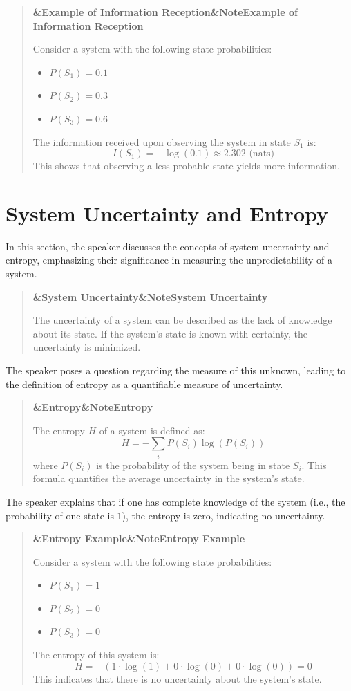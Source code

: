 \documentclass[a4paper]{article}
\newcommand{\boxheading}[1]{%
  \par\smallskip
  \noindent\textbf{\ifx&#1&Note\else#1\fi}\par
  \smallskip
}
\newenvironment{defbox}[1][]{%
  \begin{quote}\color{green!40!black}\boxheading{#1}\normalcolor
}{\end{quote}}
\newenvironment{exbox}[1][]{%
  \begin{quote}\color{brown!70!black}\boxheading{#1}\normalcolor
}{\end{quote}}
\newenvironment{rembox}[1][]{%
  \begin{quote}\color{black!70}\boxheading{#1}\normalcolor
}{\end{quote}}
\begin{document}
\begin{exbox}[Example of Information Reception]
Consider a system with the following state probabilities:
\begin{itemize}
    \item \( P(S_1) = 0.1 \)
    \item \( P(S_2) = 0.3 \)
    \item \( P(S_3) = 0.6 \)
\end{itemize}
The information received upon observing the system in state \( S_1 \) is:
\begin{equation}
I(S_1) = -\log(0.1) \approx 2.302 \text{ (nats)}
\end{equation}
This shows that observing a less probable state yields more information.
\end{exbox}

\section{System Uncertainty and Entropy}
In this section, the speaker discusses the concepts of system uncertainty and entropy, emphasizing their significance in measuring the unpredictability of a system.

\begin{rembox}[System Uncertainty]
The uncertainty of a system can be described as the lack of knowledge about its state. If the system's state is known with certainty, the uncertainty is minimized.
\end{rembox}

The speaker poses a question regarding the measure of this unknown, leading to the definition of entropy as a quantifiable measure of uncertainty.

\begin{defbox}[Entropy]
The entropy \( H \) of a system is defined as:
\begin{equation}
H = -\sum_{i} P(S_i) \log(P(S_i))
\end{equation}
where \( P(S_i) \) is the probability of the system being in state \( S_i \). This formula quantifies the average uncertainty in the system's state.
\end{defbox}

The speaker explains that if one has complete knowledge of the system (i.e., the probability of one state is 1), the entropy is zero, indicating no uncertainty.

\begin{exbox}[Entropy Example]
Consider a system with the following state probabilities:
\begin{itemize}
    \item \( P(S_1) = 1 \)
    \item \( P(S_2) = 0 \)
    \item \( P(S_3) = 0 \)
\end{itemize}
The entropy of this system is:
\begin{equation}
H = -\left(1 \cdot \log(1) + 0 \cdot \log(0) + 0 \cdot \log(0)\right) = 0
\end{equation}
This indicates that there is no uncertainty about the system's state.
\end{exbox}
\end{document}
